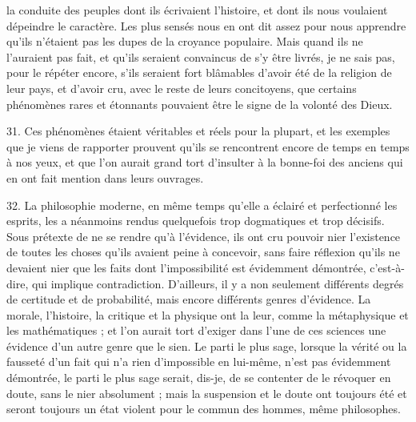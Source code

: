 \documentclass[a4paper, 11pt, oneside, polutonikogreek, french]{article}
\begin{document}
la conduite des peuples dont ils écrivaient l'histoire, et dont ils nous voulaient dépeindre le caractère. Les plus sensés nous en ont dit assez pour nous apprendre qu'ils n'étaient pas les dupes de la croyance populaire. Mais quand ils ne l'auraient pas fait, et qu'ils seraient convaincus de s'y être livrés, je ne sais pas, pour le répéter encore, s'ils seraient fort blâmables d'avoir été de la religion de leur pays, et d'avoir cru, avec le reste de leurs concitoyens, que certains phénomènes rares et étonnants pouvaient être le signe de la volonté des Dieux.

31. Ces phénomènes étaient véritables et réels pour la plupart, et les exemples que je viens de rapporter prouvent qu'ils se rencontrent encore de temps en temps à nos yeux, et que l'on aurait grand tort d'insulter à la bonne-foi des anciens qui en ont fait mention dans leurs ouvrages.

32. La philosophie moderne, en même temps qu'elle a éclairé et perfectionné les esprits, les a néanmoins rendus quelquefois trop dogmatiques et trop décisifs. Sous prétexte de ne se rendre qu'à l'évidence, ils ont cru pouvoir nier l'existence de toutes les choses qu'ils avaient peine à concevoir, sans faire réflexion qu'ils ne devaient nier que les faits dont l'impossibilité est évidemment démontrée, c'est-à-dire, qui implique contradiction. D'ailleurs, il y a non seulement différents degrés de certitude et de probabilité, mais encore différents genres d'évidence. La morale, l'histoire, la critique et la physique ont la leur, comme la métaphysique et les mathématiques ; et l'on aurait tort d'exiger dans l'une de ces sciences une évidence d'un autre genre que le sien. Le parti le plus sage, lorsque la vérité ou la fausseté d'un fait qui n'a rien d'impossible en lui-même, n'est pas évidemment démontrée, le parti le plus sage serait, dis-je, de se contenter de le révoquer en doute, sans le nier absolument ; mais la suspension et le doute ont toujours été et seront toujours un état violent pour le commun des hommes, même philosophes.
\end{document}
